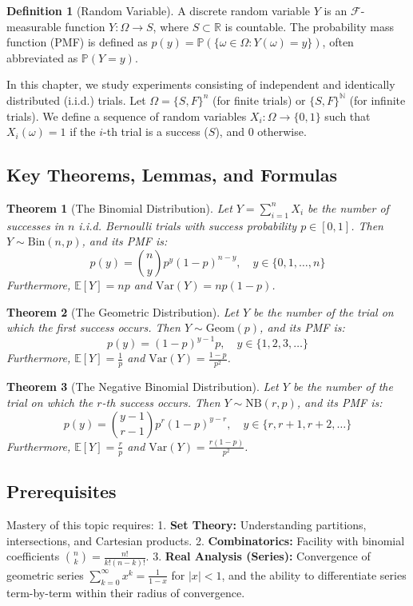 \documentclass[11pt, letterpaper]{article}
\newtheorem{theorem}{Theorem}[section]
\theoremstyle{definition}
\newtheorem{definition}{Definition}[section]
\theoremstyle{remark}
\newcommand{\E}{\mathbb{E}}
\newcommand{\Var}{\mathrm{Var}}
\newcommand{\Prob}{\mathbb{P}}
\newcommand{\R}{\mathbb{R}}
\newcommand{\N}{\mathbb{N}}
\newcommand{\F}{\mathcal{F}}
\begin{document}
\begin{definition}[Random Variable]
A discrete random variable $Y$ is an $\F$-measurable function $Y: \Omega \to S$, where $S \subset \R$ is countable. The probability mass function (PMF) is defined as $p(y) = \Prob(\{\omega \in \Omega : Y(\omega) = y\})$, often abbreviated as $\Prob(Y = y)$.
\end{definition}

In this chapter, we study experiments consisting of independent and identically distributed (i.i.d.) trials. Let $\Omega = \{S, F\}^n$ (for finite trials) or $\{S, F\}^\N$ (for infinite trials). We define a sequence of random variables $X_i: \Omega \to \{0, 1\}$ such that $X_i(\omega) = 1$ if the $i$-th trial is a success ($S$), and $0$ otherwise.

\subsection{Key Theorems, Lemmas, and Formulas}

\begin{theorem}[The Binomial Distribution]
Let $Y = \sum_{i=1}^n X_i$ be the number of successes in $n$ i.i.d. Bernoulli trials with success probability $p \in [0,1]$. Then $Y \sim \mathrm{Bin}(n, p)$, and its PMF is:
\[ p(y) = \binom{n}{y} p^y (1-p)^{n-y}, \quad y \in \{0, 1, \dots, n\} \]
Furthermore, $\E[Y] = np$ and $\Var(Y) = np(1-p)$.
\end{theorem}

\begin{theorem}[The Geometric Distribution]
Let $Y$ be the number of the trial on which the \textit{first} success occurs. Then $Y \sim \mathrm{Geom}(p)$, and its PMF is:
\[ p(y) = (1-p)^{y-1} p, \quad y \in \{1, 2, 3, \dots\} \]
Furthermore, $\E[Y] = \frac{1}{p}$ and $\Var(Y) = \frac{1-p}{p^2}$.
\end{theorem}

\begin{theorem}[The Negative Binomial Distribution]
Let $Y$ be the number of the trial on which the $r$-th success occurs. Then $Y \sim \mathrm{NB}(r, p)$, and its PMF is:
\[ p(y) = \binom{y-1}{r-1} p^r (1-p)^{y-r}, \quad y \in \{r, r+1, r+2, \dots\} \]
Furthermore, $\E[Y] = \frac{r}{p}$ and $\Var(Y) = \frac{r(1-p)}{p^2}$.
\end{theorem}

\subsection{Prerequisites}
Mastery of this topic requires:
1. \textbf{Set Theory:} Understanding partitions, intersections, and Cartesian products.
2. \textbf{Combinatorics:} Facility with binomial coefficients $\binom{n}{k} = \frac{n!}{k!(n-k)!}$.
3. \textbf{Real Analysis (Series):} Convergence of geometric series $\sum_{k=0}^\infty x^k = \frac{1}{1-x}$ for $|x| < 1$, and the ability to differentiate series term-by-term within their radius of convergence.
\end{document}
